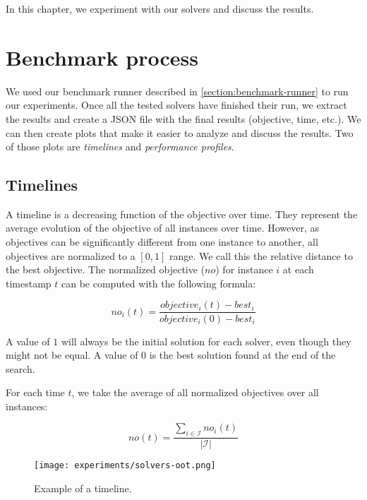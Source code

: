 \documentclass[../../thesis.tex]{subfiles}
\begin{document}
In this chapter, we experiment with our solvers and discuss the results. 

\section{Benchmark process}

We used our benchmark runner described in \autoref{section:benchmark-runner} to run our experiments.
Once all the tested solvers have finished their run, we extract the results and create a JSON file 
with the final results (objective, time, etc.). We can then create plots that make it 
easier to analyze and discuss the results. Two of those plots are \emph{timelines} and \emph{performance profiles}.

\subsection{Timelines}

A timeline is a decreasing function of the objective over time. 
They represent the average evolution of the objective of all instances over time.
However, as objectives can be 
significantly different from one instance to another, all objectives are normalized to a $[0, 1]$ range.
We call this the relative distance to the best objective. 
The normalized objective ($no$) for instance $i$ at each timestamp $t$ can 
be computed with the following formula:

\begin{equation*}
  no_i(t) = \frac{objective_i(t) - best_i}{objective_i(0) - best_i}
\end{equation*}

A value of $1$ will always be the initial solution for each solver, even though they might not be equal. A value of 
$0$ is the best solution found at the end of the search. 

For each time $t$, we take the average of all normalized objectives over all instances:


\begin{equation*}
   no(t) = \frac{\sum_{i \in \mathcal{I}} no_{i}(t)}{|\mathcal{I}|}
\end{equation*}



\begin{figure}
  \centering
  \texttt{[image: experiments/solvers-oot.png]}
  \caption{Example of a timeline.}
  \label{timeline-example}
\end{figure}
\end{document}
